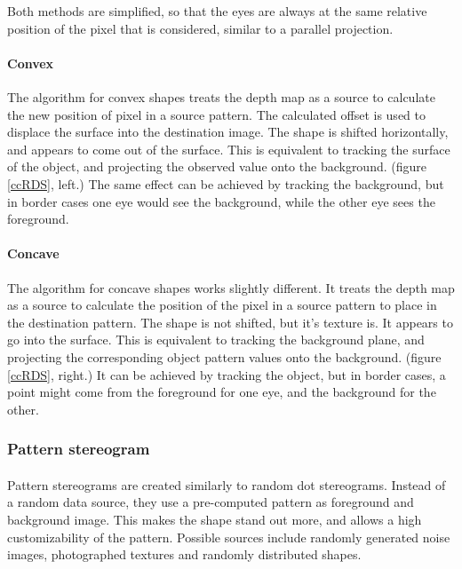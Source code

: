 Both methods are simplified, so that the eyes are always at the same relative position of the pixel that is considered, similar to a parallel projection.

\paragraph{Convex}
The algorithm for convex shapes treats the depth map as a source to calculate the new position of pixel in a source pattern. The calculated offset is used to displace the surface into the destination image. The shape is shifted horizontally, and appears to come out of the surface. This is equivalent to tracking the surface of the object, and projecting the observed value onto the background. (figure \ref{ccRDS}, left.)
The same effect can be achieved by tracking the background, but in border cases one eye would see the background, while the other eye sees the foreground.

\paragraph{Concave}
The algorithm for concave shapes works slightly different. It treats the depth map as a source to calculate the position of the pixel in a source pattern to place in the destination pattern. The shape is not shifted, but it's texture is. It appears to go into the surface. This is equivalent to tracking the background plane, and projecting the corresponding object pattern values onto the background. (figure \ref{ccRDS}, right.)
It can be achieved by tracking the object, but in border cases,  a point might come from the foreground for one eye, and the background for the other.

\subsubsection{Pattern stereogram}
\paragraph{}
Pattern stereograms are created similarly to random dot stereograms. Instead of a random data source, they use a pre-computed pattern as foreground and background image. This makes the shape stand out more, and allows a high customizability of the pattern. Possible sources include randomly generated noise images, photographed textures and randomly distributed shapes.

